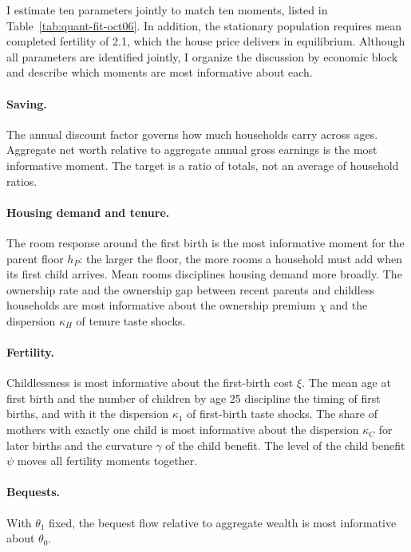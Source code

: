 I estimate ten parameters jointly to match ten moments, listed in
Table~\ref{tab:quant-fit-oct06}. In addition, the stationary population
requires mean completed fertility of 2.1, which the house price delivers in
equilibrium. Although all parameters are identified jointly, I organize the
discussion by economic block and describe which moments are most informative
about each.

\paragraph{Saving.}
The annual discount factor governs how much households carry across ages.
Aggregate net worth relative to aggregate annual gross earnings is the most
informative moment. The target is a ratio of totals, not an average of
household ratios.

\paragraph{Housing demand and tenure.}
The room response around the first birth is the most informative moment for
the parent floor $h_P$: the larger the floor, the more rooms a household must
add when its first child arrives. Mean rooms disciplines housing demand more
broadly. The ownership rate and the ownership gap between recent parents and
childless households are most informative about the ownership premium $\chi$
and the dispersion $\kappa_H$ of tenure taste shocks.

\paragraph{Fertility.}
Childlessness is most informative about the first-birth cost $\xi$. The mean
age at first birth and the number of children by age 25 discipline the timing
of first births, and with it the dispersion $\kappa_1$ of first-birth taste
shocks. The share of mothers with exactly one child is most informative about
the dispersion $\kappa_C$ for later births and the curvature $\gamma$ of the
child benefit. The level of the child benefit $\psi$ moves all fertility
moments together.

\paragraph{Bequests.}
With $\theta_1$ fixed, the bequest flow relative to aggregate wealth is most
informative about $\theta_0$.

